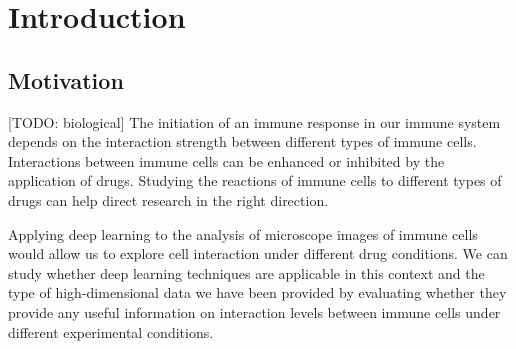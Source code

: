 \documentclass{l4proj}
\begin{document}
%
%
%
%
%
%
%
%
\chapter{Introduction}


\section{Motivation}

[TODO: biological]
The initiation of an immune response in our immune system depends on the interaction strength between different types of immune cells. Interactions between immune cells can be enhanced or inhibited by the application of drugs. Studying the reactions of immune cells to different types of drugs can help direct research in the right direction.

Applying deep learning to the analysis of microscope images of immune cells would allow us to explore cell interaction under different drug conditions. We can study whether deep learning techniques are applicable in this context and the type of high-dimensional data we have been provided by evaluating whether they provide any useful information on interaction levels between immune cells under different experimental conditions.
\end{document}
